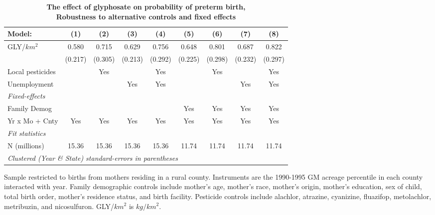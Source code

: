 \begin{table}[htbp]
   \centering
   \small
   \begin{threeparttable}[b]
      \caption{\label{tab:robust-cntrl-i_preterm-percentilegmacres} \textbf{The effect of glyphosate on probability of preterm birth, \\ Robustness to alternative controls and fixed effects}}
      \begin{tabular}{lcccccccc}
         \toprule
         Model:           & (1)     & (2)     & (3)     & (4)     & (5)     & (6)     & (7)     & (8)\\  
         \midrule 
         GLY/$km^2$       & 0.580   & 0.715   & 0.629   & 0.756   & 0.648   & 0.801   & 0.687   & 0.822\\   
                          & (0.217) & (0.305) & (0.213) & (0.292) & (0.225) & (0.298) & (0.232) & (0.297)\\   
         Local pesticides &         & Yes     &         & Yes     &         & Yes     &         & Yes\\  
         Unemployment     &         &         & Yes     & Yes     &         &         & Yes     & Yes\\  
         \midrule
         \emph{Fixed-effects}\\
         Family Demog     &         &         &         &         & Yes     & Yes     & Yes     & Yes\\  
         Yr x Mo + Cnty   & Yes     & Yes     & Yes     & Yes     & Yes     & Yes     & Yes     & Yes\\  
         \midrule
         \emph{Fit statistics}\\
         N (millions)     & 15.36   & 15.36   & 15.36   & 15.36   & 11.74   & 11.74   & 11.74   & 11.74\\  
         \midrule
         \multicolumn{9}{l}{\emph{Clustered (Year \& State) standard-errors in parentheses}}\\
      \end{tabular}
      
      \begin{tablenotes}\item Sample restricted to births from mothers residing in a rural county. Instruments are the 1990-1995 GM acreage percentile in each county interacted with year. Family demographic controls include mother's age, mother's race, mother's origin, mother's education, sex of child, total birth order, mother's residence status, and birth facility. Pesticide controls include alachlor, atrazine, cyanizine, fluazifop, metolachlor, metribuzin, and nicosulfuron. GLY/$km^2$ is $kg/km^2$.
      \end{tablenotes}
   \end{threeparttable}
\end{table}
